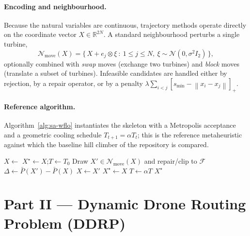 \documentclass[11pt,a4paper]{article}
\newcommand{\R}{\mathbb{R}}
\newcommand{\norm}[1]{\left\lVert #1 \right\rVert}
\begin{document}
\paragraph{Encoding and neighbourhood.}
Because the natural variables are continuous, trajectory methods operate
directly on the coordinate vector $X\in\R^{2N}$. A standard neighbourhood
perturbs a single turbine,
\begin{equation}
  \mathcal{N}_{\text{move}}(X)
  = \bigl\{\, X + e_{j}\otimes \xi \ : \ 1\le j\le N,\ \xi\sim\mathcal{N}(0,\sigma^{2}I_{2}) \,\bigr\},
  \label{eq:wflo-neighbourhood}
\end{equation}
optionally combined with \emph{swap} moves (exchange two turbines) and
\emph{block} moves (translate a subset of turbines). Infeasible candidates are
handled either by rejection, by a repair operator, or by a penalty
$\lambda\sum_{i<j}[s_{\min}-\norm{x_{i}-x_{j}}]_{+}$.

\paragraph{Reference algorithm.}
Algorithm~\ref{alg:sa-wflo} instantiates the skeleton with a Metropolis
acceptance and a geometric cooling schedule $T_{t+1}=\alpha T_{t}$; this is the
reference metaheuristic against which the baseline hill climber of the
repository is compared.

\begin{algorithm}[H]
\caption{Simulated annealing for WFLO (maximisation of $\bar{P}$)}
\label{alg:sa-wflo}
\begin{algorithmic}[1]
\State $X \leftarrow$ 
\State $X^{\star} \leftarrow X$;\quad $T \leftarrow T_{0}$
  \Repeat
    \State Draw $X' \in \mathcal{N}_{\text{move}}(X)$ and repair/clip to $\mathcal{F}$
    \State $\Delta \leftarrow \bar{P}(X') - \bar{P}(X)$
      \State $X \leftarrow X'$
        \State $X^{\star} \leftarrow X$
      \EndIf
    \EndIf
  \State $T \leftarrow \alpha T$
\EndWhile
\State \Return $X^{\star}$
\end{algorithmic}
\end{algorithm}

\section{Part II --- Dynamic Drone Routing Problem (DDRP)}
\end{document}
